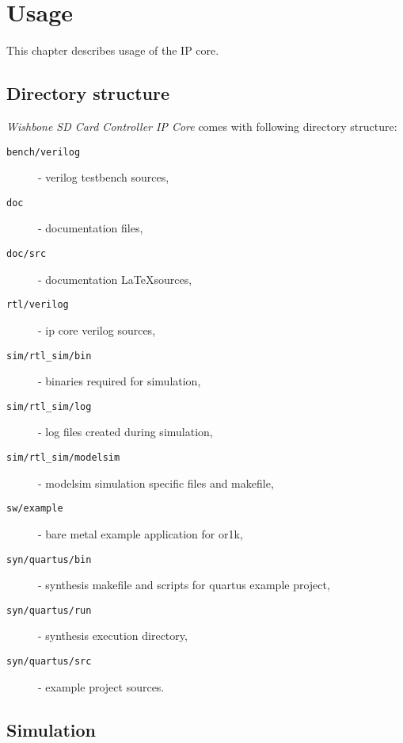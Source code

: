 \section{Usage}
\label{chap:usage}

    This chapter describes usage of the IP core.
    
    \subsection{Directory structure}
    \label{sec:dir_struct}
    
    \textit{Wishbone SD Card Controller IP Core} comes with following directory structure:
    
    
    \begin{description}
    \item[\texttt{bench/verilog}] - verilog testbench sources,
    \item[\texttt{doc}] - documentation files,
    \item[\texttt{doc/src}] - documentation \LaTeX sources,
    \item[\texttt{rtl/verilog}] - ip core verilog sources,
    \item[\texttt{sim/rtl\_sim/bin}] - binaries required for simulation,
    \item[\texttt{sim/rtl\_sim/log}] - log files created during simulation,
    \item[\texttt{sim/rtl\_sim/modelsim}] - modelsim simulation specific files and makefile,
    \item[\texttt{sw/example}] - bare metal example application for or1k,
    \item[\texttt{syn/quartus/bin}] - synthesis makefile and scripts for quartus example project,
    \item[\texttt{syn/quartus/run}] - synthesis execution directory,
    \item[\texttt{syn/quartus/src}] - example project sources.
    \end{description}
    
    \subsection{Simulation}
    \label{sec:simulation}
    
